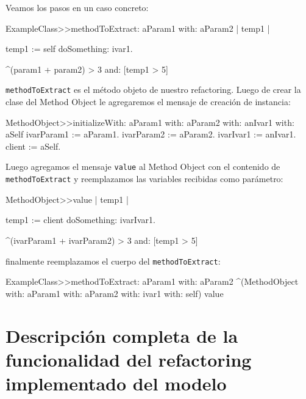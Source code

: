 Veamos los pasos en un caso concreto:

\begin{code}
ExampleClass>>methodToExtract: aParam1 with: aParam2
    | temp1 |

    temp1 := self doSomething: ivar1.

    ^(param1 + param2) > 3 and: [temp1 > 5]
\end{code}

\lstinline{methodToExtract} es el método objeto de nuestro refactoring. Luego de crear la clase del
Method Object le agregaremos el mensaje de creación de instancia:

\begin{code}
MethodObject>>initializeWith: aParam1 with: aParam2 with: anIvar1 with: aSelf
    ivarParam1 := aParam1.
    ivarParam2 := aParam2.
    ivarIvar1 := anIvar1.
    client := aSelf.
\end{code}

Luego agregamos el mensaje \lstinline{value} al Method Object con el contenido de
\lstinline{methodToExtract} y reemplazamos las variables recibidas como parámetro:

\begin{code}
MethodObject>>value
    | temp1 |

    temp1 := client doSomething: ivarIvar1.

    ^(ivarParam1 + ivarParam2) > 3 and: [temp1 > 5]
\end{code}

finalmente reemplazamos el cuerpo del \lstinline{methodToExtract}:

\begin{code}
ExampleClass>>methodToExtract: aParam1 with: aParam2
    ^(MethodObject with: aParam1 with: aParam2 with: ivar1 with: self) value
\end{code}



\section{Descripción completa de la funcionalidad del refactoring implementado del modelo}


